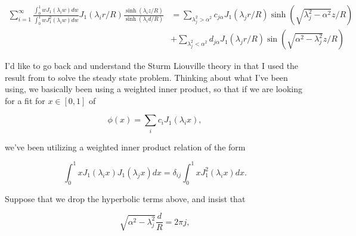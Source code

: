 \begin{equation}\label{eqn:coffeeCupWithBottom:720f}
\begin{aligned}
\sum_{i=1}^\infty 
\frac{
\int_0^1 w J_1 (\lambda_i w) dw
}{
\int_0^1 w J_1^2 (\lambda_i w) dw
}
J_1(\lambda_i r/R) \frac{\sinh(\lambda_i z/R)}{\sinh(\lambda_i d/R) } 
&=
\sum_{\lambda_j^2 > \alpha^2} c_{j \alpha} J_1(\lambda_j r/R) \sinh\left( \sqrt{\lambda_j^2 - \alpha^2} z/R \right) \\
&+\sum_{\lambda_j^2 < \alpha^2} d_{j \alpha} J_1(\lambda_j r/R) \sin\left( \sqrt{\alpha^2 -\lambda_j^2 } z/R \right)
\end{aligned}
\end{equation}

I'd like to go back and understand the Sturm Liouville theory in \citep{sagan1989boundary} that I used the result from to solve the steady state problem.  Thinking about what I've been using, we basically been using a weighted inner product, so that if we are looking for a fit for $x \in [0,1]$ of

\begin{equation}\label{eqn:coffeeCupWithBottom:820}
\phi(x) = \sum_i c_i J_1(\lambda_i x),
\end{equation}

we've been utilizing a weighted inner product relation of the form

\begin{equation}\label{eqn:coffeeCupWithBottom:840}
\int_0^1 x J_1(\lambda_i x) J_1(\lambda_j x) dx = \delta_{ij} \int_0^1 x J_1^2(\lambda_i x) dx.
\end{equation}

Suppose that we drop the hyperbolic terms above, and insist that

\begin{equation}\label{eqn:coffeeCupWithBottom:860}
\sqrt{\alpha^2 - \lambda_j^2} \frac{d}{R} = 2 \pi j,
\end{equation}

